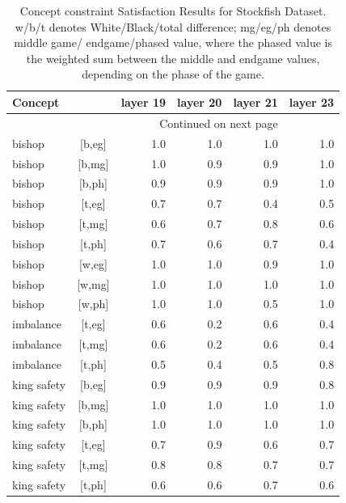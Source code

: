 \documentclass{article}
\begin{document}
\begin{longtable}{lcrrrr}
\caption{Concept constraint Satisfaction Results for Stockfish Dataset. w/b/t denotes White/Black/total difference; mg/eg/ph denotes middle game/ endgame/phased value, where the phased value is the weighted sum between the middle and endgame values, depending on the phase of the game.}
\label{table:cp_stockfish} \\ 
\toprule
Concept &  &  layer 19 &  layer 20 &  layer 21 &  layer 23 \\
\midrule
\endhead
\midrule
\multicolumn{5}{r}{{Continued on next page}} \\
\midrule
\endfoot
\bottomrule
\endlastfoot
bishop & [b,eg] &      1.0 &      1.0 &      1.0 &      1.0 \\
bishop & [b,mg] &      1.0 &      0.9 &      0.9 &      1.0 \\
bishop & [b,ph] &      0.9 &      0.9 &      0.9 &      1.0 \\
bishop & [t,eg] &      0.7 &      0.7 &      0.4 &      0.5 \\
bishop & [t,mg] &      0.6 &      0.7 &      0.8 &      0.6 \\
bishop & [t,ph] &      0.7 &      0.6 &      0.7 &      0.4 \\
bishop & [w,eg] &      1.0 &      1.0 &      0.9 &      1.0 \\
bishop & [w,mg] &      1.0 &      1.0 &      1.0 &      1.0 \\
bishop & [w,ph] &      1.0 &      1.0 &      0.5 &      1.0 \\
    imbalance & [t,eg] &      0.6 &      0.2 &      0.6 &      0.4 \\
    imbalance & [t,mg] &      0.6 &      0.2 &      0.6 &      0.4 \\
    imbalance & [t,ph] &      0.5 &      0.4 &      0.5 &      0.8 \\
  king safety & [b,eg] &      0.9 &      0.9 &      0.9 &      0.8 \\
  king safety & [b,mg] &      1.0 &      1.0 &      1.0 &      1.0 \\
  king safety & [b,ph] &      1.0 &      1.0 &      1.0 &      1.0 \\
  king safety & [t,eg] &      0.7 &      0.9 &      0.6 &      0.7 \\
  king safety & [t,mg] &      0.8 &      0.8 &      0.7 &      0.7 \\
  king safety & [t,ph] &      0.6 &      0.6 &      0.7 &      0.6 \\

\end{longtable}
\end{document}
